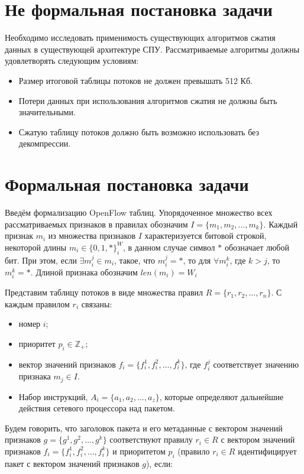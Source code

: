 \documentclass[a4peper, 12pt, titlepage, finall]{extreport}
\begin{document}
    \section{Не формальная постановка задачи}
        Необходимо исследовать применимость существующих алгоритмов сжатия данных в существующей архитектуре СПУ.
        Рассматриваемые алгоритмы должны удовлетворять следующим условиям:
        \begin{itemize}
            \item Размер итоговой таблицы потоков не должен превышать 512 Кб.
            \item Потери данных при использования алгоритмов сжатия не должны быть значительными.
            \item Сжатую таблицу потоков должно быть возможно использовать без декомпрессии.
        \end{itemize}
    \section{Формальная постановка задачи}
        Введём формализацию OpenFlow таблиц.
        Упорядоченное множество всех рассматриваемых признаков в правилах обозначим \(I=\{m_1,m_2,\ldots,m_k\}\). 
        Каждый признак \(m_i\) из множества признаков \(I\) характеризуется битовой строкой, некоторой длины \(m_i \in \{0, 1, *\}^W_i\),
        в данном случае символ \(*\) обозначает любой бит. При этом, если \(\exists m_i^j \in m_i\), такое, что 
        \( m_i^j = *\), то для \( \forall m_i^k \), где \(k > j\), то \( m_i^k = *\). Длиной признака обозначим \(len(m_i) = W_i\)

        Представим таблицу потоков в виде множества правил \(R=\{r_1,r_2,\ldots,r_n\}\). С каждым правилом \(r_i\) связаны:
        \begin{itemize}
            \item номер \(i\);
            \item приоритет \(p_i\in \mathbb{Z_+}\);
            \item вектор значений признаков \(f_i=\{f_i^1,f_i^2,\ldots,f_i^k\}\), где \(f_i^j\) соответствует значению признака \(m_j\in I\). %
            \item Набор инструкций, \(A_i = \{a_1, a_2, \ldots, a_z\} \), которые определяют дальнейшие действия сетевого процессора над пакетом.
        \end{itemize}

        Будем говорить, что заголовок пакета и его метаданные с вектором значений признаков \(g=\{g^1,g^2,\ldots,g^k\}\) 
        соответствуют правилу \(r_i\in R\) с вектором значений признаков \(f_i=\{f_i^1,f_i^2,\ldots,f_i^k\}\) 
        и приоритетом \(p_i\) (правило \(r_i\in R\) идентифицирует пакет с вектором значений признаков \(g\)), если:
\end{document}
